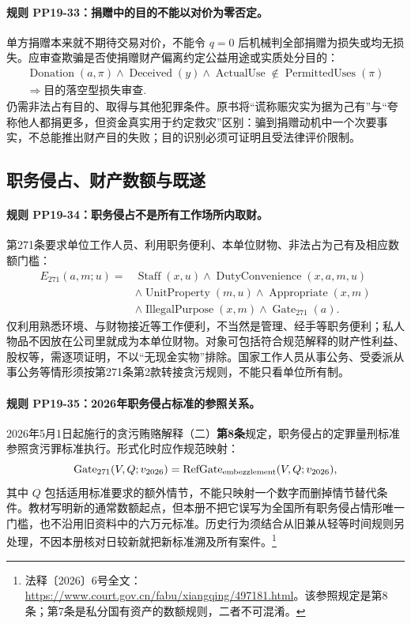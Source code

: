 \paragraph{规则 PP19-33：捐赠中的目的不能以对价为零否定。}
\mbox{}\par
单方捐赠本来就不期待交易对价，不能令 $q=0$ 后机械判全部捐赠为损失或均无损失。应审查欺骗是否使捐赠财产偏离约定公益用途或实质处分目的：
\[
\begin{gathered}
\operatorname{Donation}(a,\pi)\land\operatorname{Deceived}(y)
\land\operatorname{ActualUse}\notin\operatorname{PermittedUses}(\pi)\\
\Rightarrow\text{目的落空型损失审查}.
\end{gathered}
\]
仍需非法占有目的、取得与其他犯罪条件。原书将“谎称赈灾实为据为己有”与“夸称他人都捐更多，但资金真实用于约定救灾”区别：骗到捐赠动机中一个次要事实，不总能推出财产目的失败；目的识别必须可证明且受法律评价限制。

\subsection{职务侵占、财产数额与既遂}
\paragraph{规则 PP19-34：职务侵占不是所有工作场所内取财。}
\mbox{}\par
第271条要求单位工作人员、利用职务便利、本单位财物、非法占为己有及相应数额门槛：
\[
\begin{aligned}
E_{271}(a,m;u)={}&\operatorname{Staff}(x,u)
\land\operatorname{DutyConvenience}(x,a,m,u)\\
&\land\operatorname{UnitProperty}(m,u)
\land\operatorname{Appropriate}(x,m)\\
&\land\operatorname{IllegalPurpose}(x,m)
\land\operatorname{Gate}_{271}(a).
\end{aligned}
\]
仅利用熟悉环境、与财物接近等工作便利，不当然是管理、经手等职务便利；私人物品不因放在公司里就成为本单位财物。对象可包括符合规范解释的财产性利益、股权等，需逐项证明，不以“无现金实物”排除。国家工作人员从事公务、受委派从事公务等情形须按第271条第2款转接贪污规则，不能只看单位所有制。

\paragraph{规则 PP19-35：2026年职务侵占标准的参照关系。}
\mbox{}\par
2026年5月1日起施行的贪污贿赂解释（二）\textbf{第8条}规定，职务侵占的定罪量刑标准参照贪污罪标准执行。形式化时应作规范映射：
\[
\operatorname{Gate}_{271}(V,Q;v_{2026})
=\operatorname{RefGate}_{\rm embezzlement}(V,Q;v_{2026}),
\]
其中 $Q$ 包括适用标准要求的额外情节，不能只映射一个数字而删掉情节替代条件。教材写明新的通常数额起点，但本册不把它误写为全国所有职务侵占情形唯一门槛，也不沿用旧资料中的六万元标准。历史行为须结合从旧兼从轻等时间规则另处理，不因本册核对日较新就把新标准溯及所有案件。\footnote{法释〔2026〕6号全文：\url{https://www.court.gov.cn/fabu/xiangqing/497181.html}。该参照规定是第8条；第7条是私分国有资产的数额规则，二者不可混淆。}

